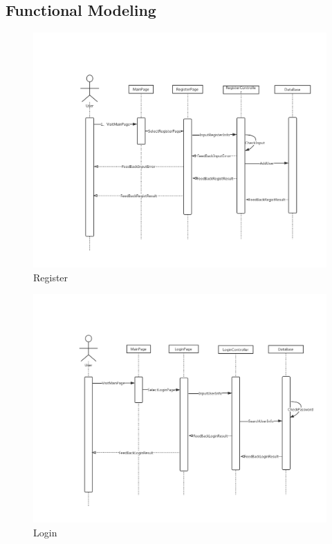 \documentclass[16pt]{scrreprt}
\begin{document}
\subsection{Functional Modeling}
\begin{figure}[H]
    \includegraphics[width=\linewidth]{./FuncPhoto/1.png}   
    \caption{Register}
\end{figure}


\begin{figure}[H]
    \includegraphics[width=\linewidth]{./FuncPhoto/2.png}   
    \caption{Login}
\end{figure}
\end{document}
